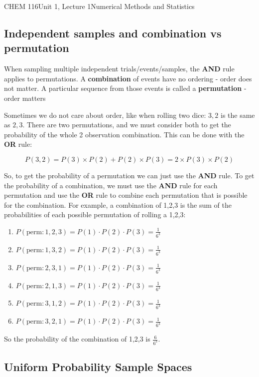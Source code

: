 \documentclass{article}
\begin{document}
\begin{tdoc}{CHEM 116}{Unit 1, Lecture 1}{Numerical Methods and Statistics}
\subsection{Independent samples and combination vs permutation}

When sampling multiple independent trials/events/samples, the {\bf
  AND} rule applies to permutations. A {\bf combination} of events
have no ordering - order does not matter. A particular sequence from
those events is called a {\bf permutation} - order
matters\vspace{0.2cm}

Sometimes we do not care about order, like when rolling two dice:
$3,2$ is the same as $2,3$. There are two permutations, and we must
consider both to get the probability of the whole 2 observation
combination. This can be done with the {\bf OR} rule:

\begin{equation}
P(3,2) = P(3)\times P(2) + P(2) \times P(3) = 2\times P(3)\times P(2)
\end{equation}

So, to get the probability of a permutation we can just use the {\bf
  AND} rule. To get the probability of a combination, we must use the
{\bf AND} rule for each permutation and use the {\bf OR} rule to
combine each permutation that is possible for the combination. For
example, a combination of 1,2,3 is the sum of the probabilities of
each possible permutation of rolling a 1,2,3:
\begin{enumerate}
\item $P(\textrm{perm}: 1,2,3) = P(1)\cdot P(2) \cdot P(3) = \frac{1}{6^3}$
\item $P(\textrm{perm}: 1,3,2) = P(1)\cdot P(2) \cdot P(3) = \frac{1}{6^3}$
\item $P(\textrm{perm}: 2,3,1) = P(1)\cdot P(2) \cdot P(3) = \frac{1}{6^3}$
\item $P(\textrm{perm}: 2,1,3) = P(1)\cdot P(2) \cdot P(3) = \frac{1}{6^3}$
\item $P(\textrm{perm}: 3,1,2) = P(1)\cdot P(2) \cdot P(3) = \frac{1}{6^3}$
\item $P(\textrm{perm}: 3,2,1) = P(1)\cdot P(2) \cdot P(3) = \frac{1}{6^3}$
\end{enumerate}
So the probability of the combination of 1,2,3 is
$\frac{6}{6^3}$.

\subsection{Uniform Probability Sample Spaces}


\end{tdoc}
\end{document}
